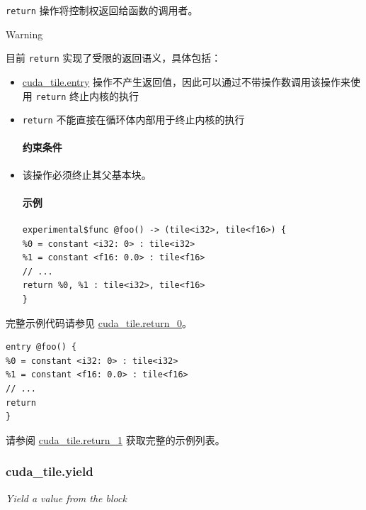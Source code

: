 \documentclass{article}
\begin{document}
\texttt{return} 操作将控制权返回给函数的调用者。


Warning


目前 \texttt{return} 实现了受限的返回语义，具体包括：


\begin{itemize}
\item \href{https://docs.nvidia.com/cuda/tile-ir/latest/sections/operations.html#op-cuda-tile-entry}{cuda\_tile.entry} 操作不产生返回值，因此可以通过不带操作数调用该操作来使用 \texttt{return} 终止内核的执行
\item \texttt{return} 不能直接在循环体内部用于终止内核的执行


\paragraph{约束条件}

\item 该操作必须终止其父基本块。


\paragraph{示例}

\begin{lstlisting}
experimental$func @foo() -> (tile<i32>, tile<f16>) {
%0 = constant <i32: 0> : tile<i32>
%1 = constant <f16: 0.0> : tile<f16>
// ...
return %0, %1 : tile<i32>, tile<f16>
}
\end{lstlisting}

\end{itemize}
完整示例代码请参见 \href{https://docs.nvidia.com/cuda/tile-ir/latest/sections/appendix.html#example-cuda-tile-return-0}{cuda\_tile.return\_0}。


\begin{lstlisting}
entry @foo() {
%0 = constant <i32: 0> : tile<i32>
%1 = constant <f16: 0.0> : tile<f16>
// ...
return
}
\end{lstlisting}

请参阅 \href{https://docs.nvidia.com/cuda/tile-ir/latest/sections/appendix.html#example-cuda-tile-return-1}{cuda\_tile.return\_1} 获取完整的示例列表。



\subsubsection{cuda\_tile.yield}

\textit{Yield a value from the block}
\end{document}
